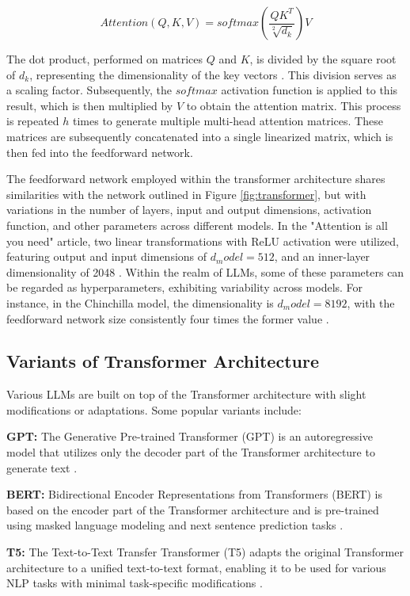 \begin{equation}\label{eq:attention}
    Attention(Q,K,V) = softmax(\frac{QK^T}{\sqrt[2]{d_k}})V
\end{equation}

The dot product, performed on matrices \(Q\) and \(K\), is divided by the square root of \(d_k\), representing the dimensionality of the key vectors \cite{vaswani2023attention}. This division serves as a scaling factor. Subsequently, the \(softmax\) activation function is applied to this result, which is then multiplied by \(V\) to obtain the attention matrix. This process is repeated \(h\) times to generate multiple multi-head attention matrices. These matrices are subsequently concatenated into a single linearized matrix, which is then fed into the feedforward network.

The feedforward network employed within the transformer architecture shares similarities with the network outlined in Figure \ref{fig:transformer}, but with variations in the number of layers, input and output dimensions, activation function, and other parameters across different models. In the "Attention is all you need" article, two linear transformations with ReLU activation were utilized, featuring output and input dimensions of \(d_model = 512\), and an inner-layer dimensionality of 2048 \cite{vaswani2023attention}. Within the realm of LLMs, some of these parameters can be regarded as hyperparameters, exhibiting variability across models. For instance, in the Chinchilla  model, the dimensionality is \(d_model = 8192\), with the feedforward network size consistently four times the former value \cite{hoffmann2022training}.

\subsection{Variants of Transformer Architecture}

Various LLMs are built on top of the Transformer architecture with slight modifications or adaptations. Some popular variants include:

\textbf{GPT:} The Generative Pre-trained Transformer (GPT) is an autoregressive model that utilizes only the decoder part of the Transformer architecture to generate text \cite{openai:gpt}.

\textbf{BERT:} Bidirectional Encoder Representations from Transformers (BERT) is based on the encoder part of the Transformer architecture and is pre-trained using masked language modeling and next sentence prediction tasks \cite{devlin2019bert}.

\textbf{T5:} The Text-to-Text Transfer Transformer (T5) adapts the original Transformer architecture to a unified text-to-text format, enabling it to be used for various NLP tasks with minimal task-specific modifications \cite{raffel2023exploring}.